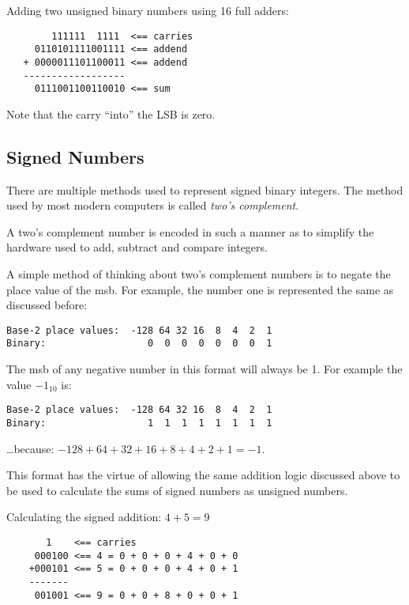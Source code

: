 Adding two unsigned binary numbers using 16 full adders:

\begin{verbatim}
        111111  1111  <== carries
     0110101111001111 <== addend
   + 0000011101100011 <== addend
   ------------------
     0111001100110010 <== sum
\end{verbatim}

Note that the carry ``into'' the LSB is zero.



\subsection{Signed Numbers}

There are multiple methods used to represent signed binary integers.
The method used by most modern computers is called {\em two's complement}.

A two's complement number is encoded in such a manner as to simplify
the hardware used to add, subtract and compare integers.  

A simple method of thinking about two's complement numbers is to
negate the place value of the \acrshort{msb}.  For example, the 
number one is represented the same as discussed before:

\begin{verbatim}
Base-2 place values:  -128 64 32 16  8  4  2  1
Binary:                  0  0  0  0  0  0  0  1
\end{verbatim}

The \acrshort{msb} of any negative number in this format will always
be 1.  For example the value $-1_{10}$ is:

\begin{verbatim}
Base-2 place values:  -128 64 32 16  8  4  2  1
Binary:                  1  1  1  1  1  1  1  1
\end{verbatim}

\ldots because: $-128+64+32+16+8+4+2+1=-1$.

This format has the virtue of allowing the same addition logic discussed above to be 
used to calculate the sums of signed numbers as unsigned numbers.

Calculating the signed addition: $4+5 = 9$

\begin{verbatim}
       1    <== carries
     000100 <== 4 = 0 + 0 + 0 + 4 + 0 + 0
    +000101 <== 5 = 0 + 0 + 0 + 4 + 0 + 1
    -------
     001001 <== 9 = 0 + 0 + 8 + 0 + 0 + 1
\end{verbatim}


